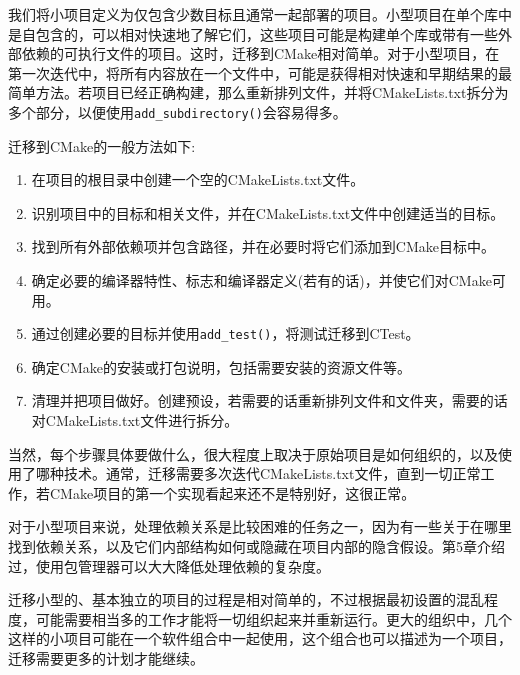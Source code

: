 我们将小项目定义为仅包含少数目标且通常一起部署的项目。小型项目在单个库中是自包含的，可以相对快速地了解它们，这些项目可能是构建单个库或带有一些外部依赖的可执行文件的项目。这时，迁移到CMake相对简单。对于小型项目，在第一次迭代中，将所有内容放在一个文件中，可能是获得相对快速和早期结果的最简单方法。若项目已经正确构建，那么重新排列文件，并将CMakeLists.txt拆分为多个部分，以便使用\texttt{add\_subdirectory()}会容易得多。

迁移到CMake的一般方法如下:

\begin{enumerate}
\item 
在项目的根目录中创建一个空的CMakeLists.txt文件。

\item 
识别项目中的目标和相关文件，并在CMakeLists.txt文件中创建适当的目标。

\item 
找到所有外部依赖项并包含路径，并在必要时将它们添加到CMake目标中。

\item 
确定必要的编译器特性、标志和编译器定义(若有的话)，并使它们对CMake可用。

\item 
通过创建必要的目标并使用\texttt{add\_test()}，将测试迁移到CTest。

\item 
确定CMake的安装或打包说明，包括需要安装的资源文件等。

\item 
清理并把项目做好。创建预设，若需要的话重新排列文件和文件夹，需要的话对CMakeLists.txt文件进行拆分。
\end{enumerate}

当然，每个步骤具体要做什么，很大程度上取决于原始项目是如何组织的，以及使用了哪种技术。通常，迁移需要多次迭代CMakeLists.txt文件，直到一切正常工作，若CMake项目的第一个实现看起来还不是特别好，这很正常。

对于小型项目来说，处理依赖关系是比较困难的任务之一，因为有一些关于在哪里找到依赖关系，以及它们内部结构如何或隐藏在项目内部的隐含假设。第5章介绍过，使用包管理器可以大大降低处理依赖的复杂度。

迁移小型的、基本独立的项目的过程是相对简单的，不过根据最初设置的混乱程度，可能需要相当多的工作才能将一切组织起来并重新运行。更大的组织中，几个这样的小项目可能在一个软件组合中一起使用，这个组合也可以描述为一个项目，迁移需要更多的计划才能继续。















































